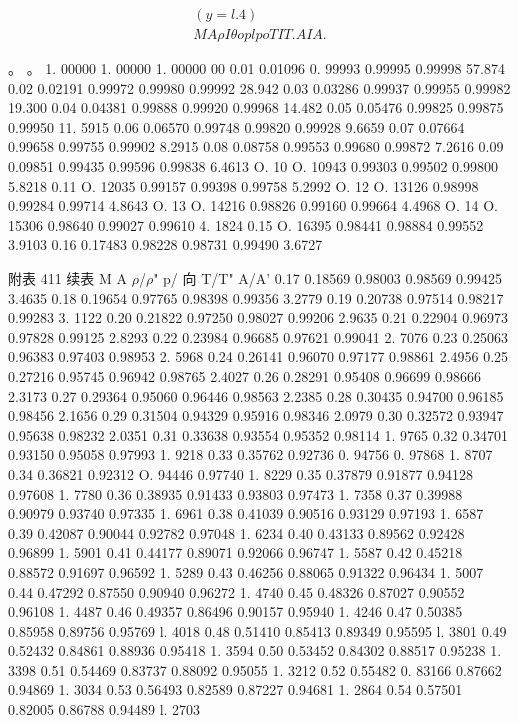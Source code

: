 \begin{gather*}
(y= l. 4)\\
M A \rho  I \theta o plpo TIT. AIA.
\end{gather*}

。 。 1. 00000 1. 00000 1. 00000 00 0.01 0.01096 0. 99993 0.99995 0.99998 57.874 0.02 0.02191 0.99972 0.99980 0.99992 28.942 0.03 0.03286 0.99937 0.99955 0.99982 19.300 0.04 0.04381 0.99888 0.99920 0.99968 14.482 0.05 0.05476 0.99825 0.99875 0.99950 11. 5915 0.06 0.06570 0.99748 0.99820 0.99928 9.6659 0.07 0.07664 0.99658 0.99755 0.99902 8.2915 0.08 0.08758 0.99553 0.99680 0.99872 7.2616 0.09 0.09851 0.99435 0.99596 0.99838 6.4613 O. 10 O. 10943 0.99303 0.99502 0.99800 5.8218 0.11 O. 12035 0.99157 0.99398 0.99758 5.2992 O. 12 O. 13126 0.98998 0.99284 0.99714 4.8643 O. 13 O. 14216 0.98826 0.99160 0.99664 4.4968 O. 14 O. 15306 0.98640 0.99027 0.99610 4. 1824 0.15 O. 16395 0.98441 0.98884 0.99552 3.9103 0.16 0.17483 0.98228 0.98731 0.99490 3.6727

附表 411 续表 M A $\rho$/$\rho$" p/ 向 T/T" A/A' 0.17 0.18569 0.98003 0.98569 0.99425 3.4635 0.18 0.19654 0.97765 0.98398 0.99356 3.2779 0.19 0.20738 0.97514 0.98217 0.99283 3. 1122 0.20 0.21822 0.97250 0.98027 0.99206 2.9635 0.21 0.22904 0.96973 0.97828 0.99125 2.8293 0.22 0.23984 0.96685 0.97621 0.99041 2. 7076 0.23 0.25063 0.96383 0.97403 0.98953 2. 5968 0.24 0.26141 0.96070 0.97177 0.98861 2.4956 0.25 0.27216 0.95745 0.96942 0.98765 2.4027 0.26 0.28291 0.95408 0.96699 0.98666 2.3173 0.27 0.29364 0.95060 0.96446 0.98563 2.2385 0.28 0.30435 0.94700 0.96185 0.98456 2.1656 0.29 0.31504 0.94329 0.95916 0.98346 2.0979 0.30 0.32572 0.93947 0.95638 0.98232 2.0351 0.31 0.33638 0.93554 0.95352 0.98114 1. 9765 0.32 0.34701 0.93150 0.95058 0.97993 1. 9218 0.33 0.35762 0.92736 0. 94756 0. 97868 1. 8707 0.34 0.36821 0.92312 O. 94446 0.97740 1. 8229 0.35 0.37879 0.91877 0.94128 0.97608 1. 7780 0.36 0.38935 0.91433 0.93803 0.97473 1. 7358 0.37 0.39988 0.90979 0.93740 0.97335 1. 6961 0.38 0.41039 0.90516 0.93129 0.97193 1. 6587 0.39 0.42087 0.90044 0.92782 0.97048 1. 6234 0.40 0.43133 0.89562 0.92428 0.96899 1. 5901 0.41 0.44177 0.89071 0.92066 0.96747 1. 5587 0.42 0.45218 0.88572 0.91697 0.96592 1. 5289 0.43 0.46256 0.88065 0.91322 0.96434 1. 5007 0.44 0.47292 0.87550 0.90940 0.96272 1. 4740 0.45 0.48326 0.87027 0.90552 0.96108 1. 4487 0.46 0.49357 0.86496 0.90157 0.95940 1. 4246 0.47 0.50385 0.85958 0.89756 0.95769 l. 4018 0.48 0.51410 0.85413 0.89349 0.95595 l. 3801 0.49 0.52432 0.84861 0.88936 0.95418 1. 3594 0.50 0.53452 0.84302 0.88517 0.95238 1. 3398 0.51 0.54469 0.83737 0.88092 0.95055 1. 3212 0.52 0.55482 0. 83166 0.87662 0.94869 1. 3034 0.53 0.56493 0.82589 0.87227 0.94681 1. 2864 0.54 0.57501 0.82005 0.86788 0.94489 l. 2703

